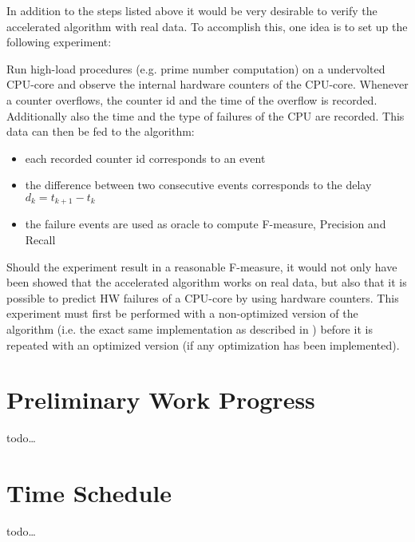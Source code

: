 \documentclass[12pt]{article} %
\begin{document}
In addition to the steps listed above it would be very desirable to verify the
accelerated algorithm with real data. To accomplish this, one idea is to set up
the following experiment:

Run high-load procedures (e.g. prime number computation) on a undervolted
CPU-core and observe the internal hardware counters of the CPU-core. Whenever
a counter overflows, the counter id and the time of the overflow is recorded.
Additionally also the time and the type of failures of the CPU are recorded.
This data can then be fed to the algorithm:
\begin{itemize}
    \item each recorded counter id corresponds to an event
    \item the difference between two consecutive events corresponds to the
        delay $ d_k = t_{k+1} - t_k $
    \item the failure events are used as oracle to compute F-measure, Precision
        and Recall
\end{itemize}
Should the experiment result in a reasonable F-measure, it would not only have
been showed that the accelerated algorithm works on real data, but also that it
is possible to predict HW failures of a CPU-core by using hardware counters.
This experiment must first be performed with a non-optimized version of the
algorithm (i.e. the exact same implementation as described in \cite{salfner08})
before it is repeated with an optimized version (if any optimization has been
implemented).


\section{Preliminary Work Progress} %
todo\dots


\section{Time Schedule} %
todo\dots


%



\end{document}
